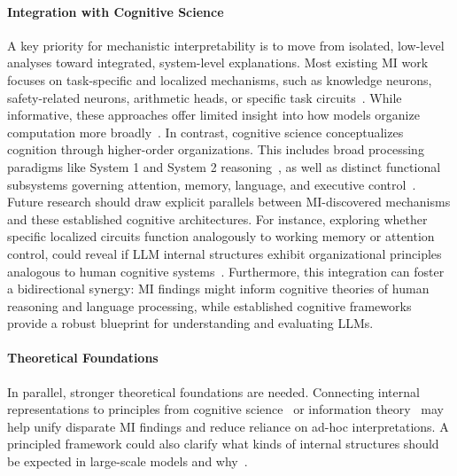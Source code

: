 \documentclass[11pt,letterpaper]{mystyle}
\begin{document}
\paragraph{Integration with Cognitive Science} 
A key priority for mechanistic interpretability is to move from isolated, low-level analyses toward integrated, system-level explanations. Most existing MI work focuses on task-specific and localized mechanisms, such as knowledge neurons, safety-related neurons, arithmetic heads, or specific task circuits~\citep{yao2024knowledge,chen2024incontext,xiao2025taskcircuit,wang2024bpo,chen2026residual,liang2026training,zhang2024interpreting,xiong2026expressionsyntaxinformationbottleneck,xiong2026mmformalizer,gurgurov2025languagearithmeticssystematiclanguage,li2025safety}. While informative, these approaches offer limited insight into how models organize computation more broadly~\citep{zhao2024explainability}. 
In contrast, cognitive science conceptualizes cognition through higher-order organizations. This includes broad processing paradigms like System 1 and System 2 reasoning~\citep{li2025system}, as well as distinct functional subsystems governing attention, memory, language, and executive control~\citep{morgan1927introduction, gruber2004executive,gruszka2010handbook,zhang2019cognitive}.
Future research should draw explicit parallels between MI-discovered mechanisms and these established cognitive architectures. For instance, exploring whether specific localized circuits function analogously to working memory or attention control, could reveal if LLM internal structures exhibit organizational principles analogous to human cognitive systems~\citep{geiger2025causal}. Furthermore, this integration can foster a bidirectional synergy: MI findings might inform cognitive theories of human reasoning and language processing, while established cognitive frameworks provide a robust blueprint for understanding and evaluating LLMs.

\paragraph{Theoretical Foundations} 
In parallel, stronger theoretical foundations are needed. Connecting internal representations to principles from cognitive science~\citep{davies2024cognitive, wulff2025advancing,zhang2025question,ren2025large} or information theory~\citep{conklin2024representations} may help unify disparate MI findings and reduce reliance on ad-hoc interpretations. A principled framework could also clarify what kinds of internal structures should be expected in large-scale models and why~\citep{kendiukhov2025review}.
\end{document}
